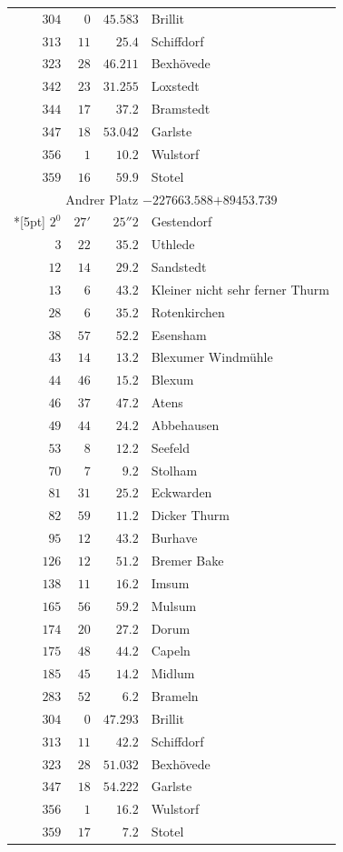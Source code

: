 \begin{longtable}{@{}rrrp{.61\linewidth}@{}}
\(304\)&\(0\)&\(45.583\)&\raggedright Brillit\tabularnewline
\(313\)&\(11\)&\(25.4\)&\raggedright Schiffdorf\tabularnewline
\(323\)&\(28\)&\(46.211\)&\raggedright Bexhövede\tabularnewline
\(342\)&\(23\)&\(31.255\)&\raggedright Loxstedt\tabularnewline
\(344\)&\(17\)&\(37.2\)&\raggedright Bramstedt\tabularnewline
\(347\)&\(18\)&\(53.042\)&\raggedright Garlste\tabularnewline
\(356\)&\(1\)&\(10.2\)&\raggedright Wulstorf\tabularnewline
\(359\)&\(16\)&\(59.9\)&\raggedright Stotel\tabularnewline
\multicolumn{4}{c}{Andrer Platz \(-227663.588\)\qquad\(+89453.739\)}\\*[5pt]
\(2^{0}\)&\(27'\)&\(25''2\)&\raggedright Gestendorf\tabularnewline
\(3\)&\(22\)&\(35.2\)&\raggedright Uthlede\tabularnewline
\(12\)&\(14\)&\(29.2\)&\raggedright Sandstedt\tabularnewline
\(13\)&\(6\)&\(43.2\)&\raggedright Kleiner nicht sehr ferner Thurm\tabularnewline
\(28\)&\(6\)&\(35.2\)&\raggedright Rotenkirchen\tabularnewline
\(38\)&\(57\)&\(52.2\)&\raggedright Esensham\tabularnewline
\(43\)&\(14\)&\(13.2\)&\raggedright Blexumer Windmühle\tabularnewline
\(44\)&\(46\)&\(15.2\)&\raggedright Blexum\tabularnewline
\(46\)&\(37\)&\(47.2\)&\raggedright Atens\tabularnewline
\(49\)&\(44\)&\(24.2\)&\raggedright Abbehausen\tabularnewline
\(53\)&\(8\)&\(12.2\)&\raggedright Seefeld\tabularnewline
\(70\)&\(7\)&\(9.2\)&\raggedright Stolham\tabularnewline
\(81\)&\(31\)&\(25.2\)&\raggedright Eckwarden\tabularnewline
\(82\)&\(59\)&\(11.2\)&\raggedright Dicker Thurm\tabularnewline
\(95\)&\(12\)&\(43.2\)&\raggedright Burhave\tabularnewline
\(126\)&\(12\)&\(51.2\)&\raggedright Bremer Bake\tabularnewline
\(138\)&\(11\)&\(16.2\)&\raggedright Imsum\tabularnewline
\(165\)&\(56\)&\(59.2\)&\raggedright Mulsum\tabularnewline
\(174\)&\(20\)&\(27.2\)&\raggedright Dorum\tabularnewline
\(175\)&\(48\)&\(44.2\)&\raggedright Capeln\tabularnewline
\(185\)&\(45\)&\(14.2\)&\raggedright Midlum\tabularnewline
\(283\)&\(52\)&\(6.2\)&\raggedright Brameln\tabularnewline
\(304\)&\(0\)&\(47.293\)&\raggedright Brillit\tabularnewline
\(313\)&\(11\)&\(42.2\)&\raggedright Schiffdorf\tabularnewline
\(323\)&\(28\)&\(51.032\)&\raggedright Bexhövede\tabularnewline
\(347\)&\(18\)&\(54.222\)&\raggedright Garlste\tabularnewline
\(356\)&\(1\)&\(16.2\)&\raggedright Wulstorf\tabularnewline
\(359\)&\(17\)&\(7.2\)&\raggedright Stotel\tabularnewline
\end{longtable}
\endgroup
